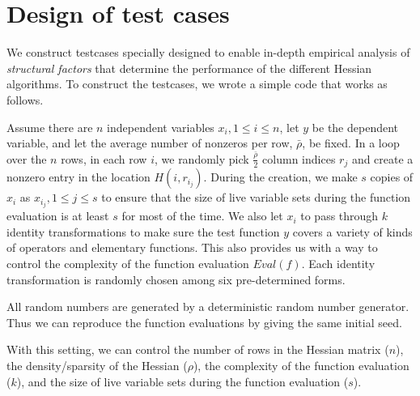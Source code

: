 \documentclass[11pt, a4paper, english]{article}
\begin{document}
\section*{Design of test cases}

We construct testcases specially designed to enable in-depth empirical analysis of {\em structural factors} that determine the performance of the  different Hessian algorithms. 
To construct the testcases, we wrote a simple code that works as follows. 

Assume there are $n$ independent variables $x_i, 1 \le i \le n$, let $y$ be the dependent variable, and let the average number of nonzeros per row, $\bar{\rho}$, be fixed. 
In a loop over the $n$ rows, in each row $i$, we randomly pick $\frac{\bar{\rho}}{2}$ column indices $r_j$ and create a nonzero entry in the location $H(i,r_{i_j})$. During the creation, we make $s$ copies of $x_i$ as $x_{i_j}, 1 \le j \le s$ to ensure that the size of live variable sets during the function evaluation is at least $s$ for most of the time. We also let $x_i$ to pass through $k$ identity transformations to make sure the test function $y$ covers a variety of kinds of operators and elementary functions. This also provides us with a way to control the complexity of the function evaluation $Eval(f)$. Each identity transformation is randomly chosen among six pre-determined forms. 

All random numbers are generated by a deterministic random number generator. Thus we can reproduce the function evaluations by giving the same initial seed.

With this setting, we can control the number of rows in the Hessian matrix ($n$), the density/sparsity of the Hessian ($\rho$), the complexity of the function evaluation ($k$), and the size of live variable sets during the function evaluation ($s$).
\end{document}
